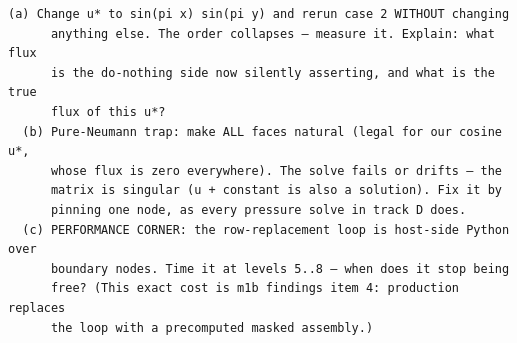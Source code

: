 \begin{explore}
\begin{verbatim}
(a) Change u* to sin(pi x) sin(pi y) and rerun case 2 WITHOUT changing
      anything else. The order collapses — measure it. Explain: what flux
      is the do-nothing side now silently asserting, and what is the true
      flux of this u*?
  (b) Pure-Neumann trap: make ALL faces natural (legal for our cosine u*,
      whose flux is zero everywhere). The solve fails or drifts — the
      matrix is singular (u + constant is also a solution). Fix it by
      pinning one node, as every pressure solve in track D does.
  (c) PERFORMANCE CORNER: the row-replacement loop is host-side Python over
      boundary nodes. Time it at levels 5..8 — when does it stop being
      free? (This exact cost is m1b findings item 4: production replaces
      the loop with a precomputed masked assembly.)
\end{verbatim}
\end{explore}

